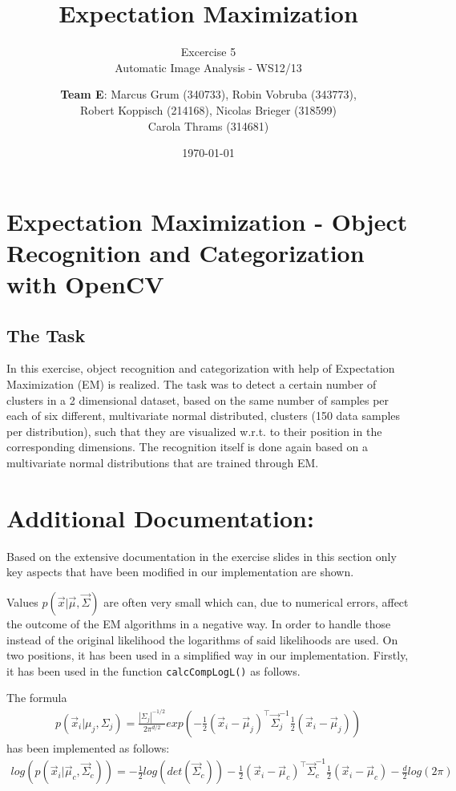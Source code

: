 \documentclass[a4paper,headings=small]{scrartcl}
\title{Expectation Maximization}
\subtitle{Excercise 5 \\ Automatic Image Analysis - WS12/13}
\author{\textbf{Team E}: Marcus Grum (340733), Robin Vobruba (343773), \\ Robert Koppisch (214168), Nicolas Brieger (318599)\\Carola Thrams (314681)}
\date{\today}
\numberwithin{equation}{section} %
\numberwithin{figure}{section}   %
\begin{document}
\maketitle

\section{Expectation Maximization - Object Recognition and Categorization with OpenCV}


\subsection{The Task}
In this exercise, object recognition and categorization
with help of Expectation Maximization (EM) is realized.
The task was to detect a certain number of clusters in a 2 dimensional dataset,
based on the same number of samples per each of six different,
multivariate normal distributed, clusters
(150 data samples per distribution),
such that they are visualized w.r.t. to their position in the corresponding dimensions.
The recognition itself is done again based on a multivariate normal distributions 
that are trained through EM.

\section{Additional Documentation:}

Based on the extensive documentation in the exercise slides
in this section only key aspects that have been modified in our implementation are shown.

Values $p( \vec x | \vec \mu, \vec \Sigma)$ are often very small which can, due to numerical errors, affect the outcome of the EM algorithms in a negative way.
In order to handle those instead of the original likelihood the logarithms of said likelihoods are used.
On two positions, it has been used in a simplified way in our implementation.
Firstly, it has been used in the function \lstinline!calcCompLogL()!
as follows.

The formula
\begin{align}
p( \vec x_i | \mu_j, \Sigma_j) =
    \frac{|\Sigma_j|^{-1/2}}{2 \pi^{d/2}}
    exp  \left( 
                     - \frac{1}{2} ( \vec x_i - \vec \mu_j )^{\top}
                       \vec \Sigma_j^{-1}
                       \frac{1}{2} ( \vec x_i - \vec \mu_j )
    \right)
\end{align}
has been implemented as follows:
\begin{align}
log \left( p( \vec x_i | \vec \mu_c, \vec \Sigma_c) \right) =
                     - \frac{1}{2} log \left( det(\vec \Sigma_c) \right)
                     - \frac{1}{2} ( \vec x_i - \vec \mu_c )^{\top}
                       \vec \Sigma_c^{-1}
                       \frac{1}{2} ( \vec x_i - \vec \mu_c )
                     - \frac{d}{2} log(2 \pi)
\end{align}
\end{document}
